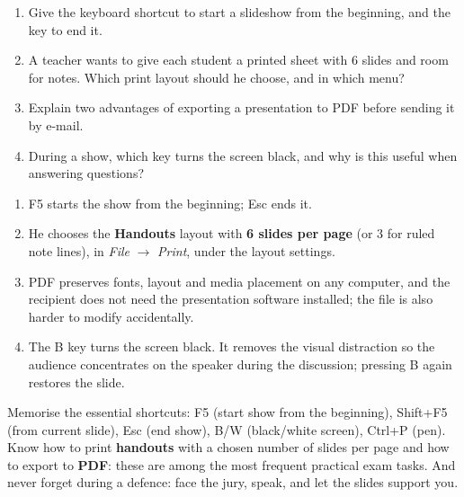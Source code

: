 \documentclass[11pt]{article}
\newcommand{\cle}[1]{{\popxbold\color{popdark}#1}}
\begin{document}
\begin{exercice}
\begin{enumerate}
\item Give the keyboard shortcut to start a slideshow from the beginning, and the key to end it.
\item A teacher wants to give each student a printed sheet with 6 slides and room for notes. Which print layout should he choose, and in which menu?
\item Explain two advantages of exporting a presentation to PDF before sending it by e-mail.
\item During a show, which key turns the screen black, and why is this useful when answering questions?
\end{enumerate}
\end{exercice}

\begin{corrige}[Exercise 1]
\begin{enumerate}
\item \cle{F5} starts the show from the beginning; \cle{Esc} ends it.
\item He chooses the \textbf{Handouts} layout with \textbf{6 slides per page} (or 3 for ruled note lines), in \emph{File} $\rightarrow$ \emph{Print}, under the layout settings.
\item PDF preserves fonts, layout and media placement on any computer, and the recipient does not need the presentation software installed; the file is also harder to modify accidentally.
\item The \cle{B} key turns the screen black. It removes the visual distraction so the audience concentrates on the speaker during the discussion; pressing B again restores the slide.
\end{enumerate}
\end{corrige}

\begin{aretenir}
Memorise the essential shortcuts: \cle{F5} (start show from the beginning), \cle{Shift+F5} (from current slide), \cle{Esc} (end show), \cle{B}/\cle{W} (black/white screen), \cle{Ctrl+P} (pen). Know how to print \textbf{handouts} with a chosen number of slides per page and how to export to \textbf{PDF}: these are among the most frequent practical exam tasks. And never forget during a defence: face the jury, speak, and let the slides support you.
\end{aretenir}

\newpage
\end{document}
